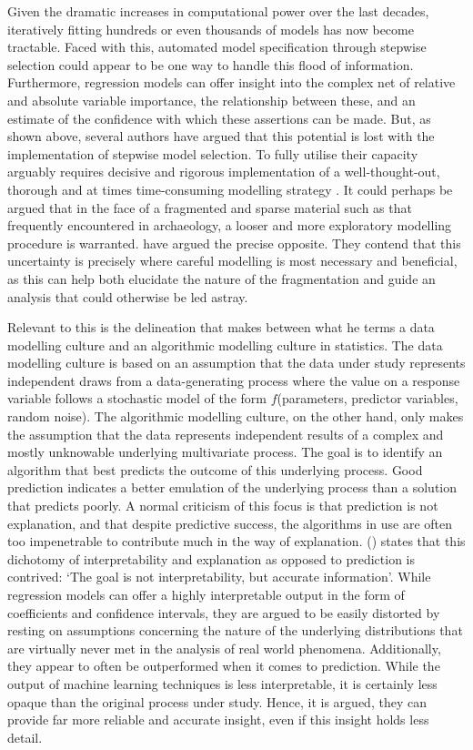 \documentclass[12pt, a4paper]{article}
\begin{document}
Given the dramatic increases in computational power over the last decades, iteratively fitting hundreds or even thousands of models has now become tractable. Faced with this, automated model specification through stepwise selection could appear to be one way to handle this flood of information. Furthermore, regression models can offer insight into the complex net of relative and absolute variable importance, the relationship between these, and an estimate of the confidence with which these assertions can be made. But, as shown above, several authors have argued that this potential is lost with the implementation of stepwise model selection. To fully utilise their capacity arguably requires decisive and rigorous implementation of a well-thought-out, thorough and at times time-consuming modelling strategy \citep[e.g.][94--99]{harrell2015}. It could perhaps be argued that in the face of a fragmented and sparse material such as that frequently encountered in archaeology, a looser and more exploratory modelling procedure is warranted. \cite{woodman2002} have argued the precise opposite. They contend that this uncertainty is precisely where careful modelling is most necessary and beneficial, as this can help both elucidate the nature of the fragmentation and guide an analysis that could otherwise be led astray.\par
Relevant to this is the delineation that \cite{breiman2001a} makes between what he terms a data modelling culture and an algorithmic modelling culture in statistics. The data modelling culture is based on an assumption that the data under study represents independent draws from a data-generating process where the value on a response variable follows a stochastic model of the form $f$(parameters, predictor variables, random noise). The algorithmic modelling culture, on the other hand, only makes the assumption that the data represents independent results of a complex and mostly unknowable underlying multivariate process. The goal is to identify an algorithm that best predicts the outcome of this underlying process. Good prediction indicates a better emulation of the underlying process than a solution that predicts poorly. A normal criticism of this focus is that prediction is not explanation, and that despite predictive success, the algorithms in use are often too impenetrable to contribute much in the way of explanation. \citeauthor{breiman2001a} (\citeyear[][210]{breiman2001a}) states that this dichotomy of interpretability and explanation as opposed to prediction is contrived: `The goal is not interpretability, but accurate information'. While regression models can offer a highly interpretable output in the form of coefficients and confidence intervals, they are argued to be easily distorted by resting on assumptions concerning the nature of the underlying distributions that are virtually never met in the analysis of real world phenomena. Additionally, they appear to often be outperformed when it comes to prediction. While the output of machine learning techniques is less interpretable, it is certainly less opaque than the original process under study. Hence, it is argued, they can provide far more reliable and accurate insight, even if this insight holds less detail. \par
\end{document}
